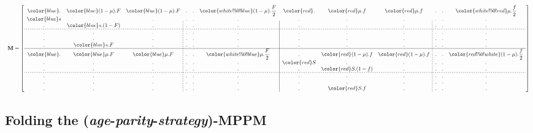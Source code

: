 \documentclass[10pt,a4paper]{article}
\begin{document}


\[
\resizebox{!}{22mm}{
$\displaystyle 
\mathbf{M}=\left[\begin{array}
{c c c;{2pt/2pt} c c c | c c c ;{2pt/2pt}c c c}
 \color{blue} . & \color{blue}(1-\mu).F & \color{blue}(1-\mu).F & . & . & \color{white!50!blue}(1-\mu).\dfrac{F}{2} &  \color{red} . & \color{red}\mu.f & \color{red}\mu.f & . & . & \color{white!50!red}\mu.\dfrac{f}{2}   \\
\color{blue} s  & . & . & . & . & . & .  & . & . & . & . & . \\
.  & \color{blue} s.(1-F) & . & . & . & . &.  & . & . & . & . & . \\
\hdashline[2pt/2pt]
.  & . & . & .  & . & . & .  & . & . &  .  & . & .  \\
.  & . & . & .  & . & . & .  & . & . &  .  & . & .  \\
.  & \color{blue}s.F & . & .  & . & . & .  & . & . &  .  & . & . \\    
\hline
\color{blue}. & \color{blue}\mu.F & \color{blue}\mu.F & . & . & \color{white!50!blue}\mu.\dfrac{F}{2}   &. & \color{red}(1-\mu).f & \color{red}(1-\mu).f & . & . & \color{red!50!white}(1-\mu).\dfrac{f}{2} \\
.  & . & . & .  & . & . & \color{red} S  & .  & . & . & . & . \\
.  & . & . & .  & . & . & .  & \color{red}S.(1-f) & . &. & . & . \\
\hdashline[2pt/2pt]
.  & . & . & .  & . & . & .  & . & . &  .  & . & .  \\
.  & . & . & .  & . & . & .  & . & . &  .  & . & .  \\
.  & . & . & . & . & . & .  & \color{red} S.f & . & . & . & . 
\end{array}\right]
$
}
\]


\subsection{Folding the (\emph{age}-\emph{parity}-\emph{strategy})-MPPM}
\end{document}
